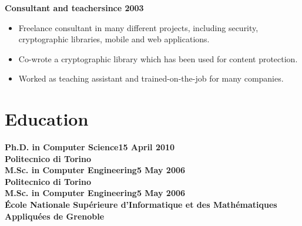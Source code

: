 \documentclass[a4paper,sans,10pt]{moderncv} %
\newcommand{\education}{Education}
\renewcommand{\education}{Formazione}
\renewcommand{\education}{Education}
\begin{document}
\vspace{0.5em}
  \textbf{Consultant and teacher}\hfill\textbf{since 2003}\\
\vspace{-1em}
  \begin{itemize}
  \item Freelance consultant in many different projects, including security, cryptographic libraries, mobile and web applications.
  \item Co-wrote a cryptographic library which has been used for content protection.
  \item Worked as teaching assistant and trained-on-the-job for many companies.
  \end{itemize}

\section{\education}
  \textbf{Ph.D. in  Computer Science}\hfill\textbf{15 April 2010}\\
  \textbf{Politecnico di Torino}\\

  \textbf{M.Sc. in  Computer Engineering}\hfill\textbf{5 May 2006}\\
  \textbf{Politecnico di Torino}\\

  \textbf{M.Sc. in  Computer Engineering}\hfill\textbf{5 May 2006}\\
  \textbf{\'Ecole Nationale Sup\'erieure d'Informatique et des Math\'ematiques Appliqu\'ees de Grenoble}
\end{document}
